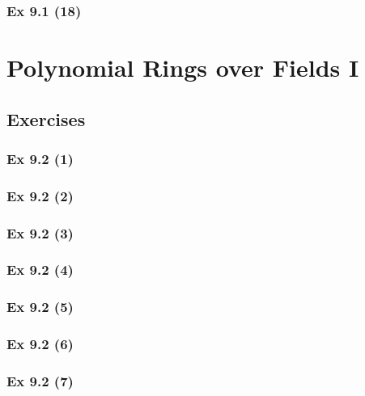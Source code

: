 \subsubsection{Ex 9.1 (18)}\label{sec:Ex_9.1.18}

\newpage		%

\section{Polynomial Rings over Fields I}\label{sec:9.2}	
\subsection*{Exercises}\label{sec:9.2_Exercises}

\subsubsection{Ex 9.2 (1)}\label{sec:Ex_9.2.1}

\subsubsection{Ex 9.2 (2)}\label{sec:Ex_9.2.2}

\subsubsection{Ex 9.2 (3)}\label{sec:Ex_9.2.3}

\subsubsection{Ex 9.2 (4)}\label{sec:Ex_9.2.4}

\subsubsection{Ex 9.2 (5)}\label{sec:Ex_9.2.5}

\subsubsection{Ex 9.2 (6)}\label{sec:Ex_9.2.6}

\subsubsection{Ex 9.2 (7)}\label{sec:Ex_9.2.7}

